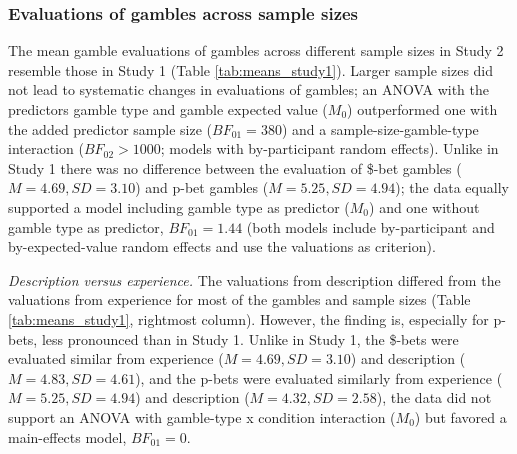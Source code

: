 \documentclass[a4paper, man, floatsintext]{apa6}
\title{}
\author{Jana B. Jarecki}
\date{21 November, 2019}
\begin{document}
\subsubsection{Evaluations of gambles across sample sizes}

The mean gamble evaluations of gambles across different sample sizes in
Study 2 resemble those in Study 1 (Table \ref{tab:means_study1}). Larger
sample sizes did not lead to systematic changes in evaluations of
gambles; an ANOVA with the predictors gamble type and gamble expected
value (\(M_0\)) outperformed one with the added predictor sample size
(\(BF_{01} = 380\)) and a sample-size-gamble-type interaction
(\(BF_{02} > 1000\); models with by-participant random effects). Unlike
in Study 1 there was no difference between the evaluation of \$-bet
gambles (\(M=4.69, SD=3.10\)) and p-bet gambles (\(M=5.25, SD=4.94\));
the data equally supported a model including gamble type as predictor
(\(M_0\)) and one without gamble type as predictor, \(BF_{01} = 1.44\)
(both models include by-participant and by-expected-value random effects
and use the valuations as criterion).

\textit{Description versus experience.} The valuations from description
differed from the valuations from experience for most of the gambles and
sample sizes (Table \ref{tab:means_study1}, rightmost column). However,
the finding is, especially for p-bets, less pronounced than in Study 1.
Unlike in Study 1, the \$-bets were evaluated similar from experience
(\(M=4.69, SD=3.10\)) and description (\(M=4.83, SD=4.61\)), and the
p-bets were evaluated similarly from experience (\(M=5.25, SD=4.94\))
and description (\(M=4.32, SD=2.58\)), the data did not support an ANOVA
with gamble-type x condition interaction (\(M_0\)) but favored a
main-effects model, \(BF_{01} = 0\).
\end{document}
